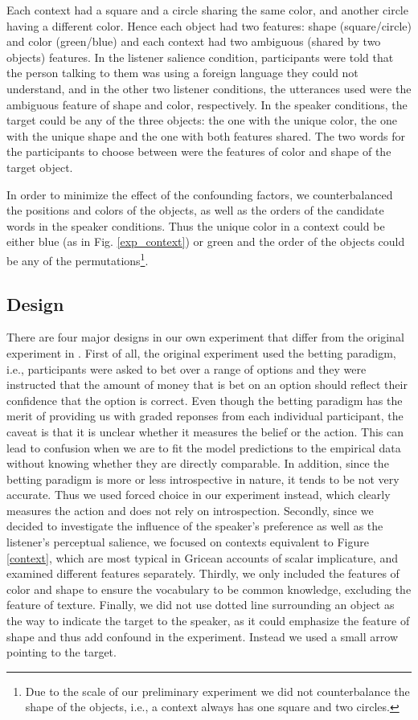Each context had a square and a circle sharing the same color, and another circle having a different color. Hence each object had two features: shape (square/circle) and color (green/blue) and each context had two ambiguous (shared by two objects) features. In the listener salience condition, participants were told that the person talking to them was using a foreign language they could not understand, and in the other two listener conditions, the utterances used were the ambiguous feature of shape and color, respectively. In the speaker conditions, the target could be any of the three objects: the one with the unique color, the one with the unique shape and the one with both features shared. The two words for the participants to choose between were the features of color and shape of the target object.

In order to minimize the effect of the confounding factors, we counterbalanced the positions and colors of the objects, as well as the orders of the candidate words in the speaker conditions. Thus the unique color in a context could be either blue (as in Fig. \ref{exp_context}) or green and the order of the objects could be any of the permutations\footnote{Due to the scale of our preliminary experiment we did not counterbalance the shape of the objects, i.e., a context always has one square and two circles. }.

\subsection*{Design}

There are four major designs in our own experiment that differ from the original experiment in \cite{Frank}. First of all, the original experiment used the betting paradigm, i.e., participants were asked to bet over a range of options and they were instructed that the amount of money that is bet on an option should reflect their confidence that the option is correct. Even though the betting paradigm has the merit of providing us with graded reponses from each individual participant, the caveat is that it is unclear whether it measures the belief or the action. This can lead to confusion when we are to fit the model predictions to the empirical data without knowing whether they are directly comparable. In addition, since the betting paradigm is more or less introspective in nature, it tends to be not very accurate. Thus we used forced choice in our experiment instead, which clearly measures the action and does not rely on introspection.
Secondly, since we decided to investigate the influence of the speaker's preference as well as the listener's perceptual salience, we focused on contexts equivalent to Figure \ref{context}, which are most typical in Gricean accounts of scalar implicature, and examined different features separately.
Thirdly, we only included the features of color and shape to ensure the vocabulary to be common knowledge, excluding the feature of texture. Finally, we did not use dotted line surrounding an object as the way to indicate the target to the speaker, as it could emphasize the feature of shape and thus add confound in the experiment. Instead we used a small arrow pointing to the target. 

